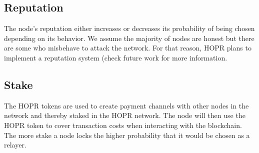 \subsection{Reputation} 
The node’s reputation either increases or decreases its probability of being chosen depending on its behavior. We assume the majority of nodes are honest but there are some who misbehave to attack the network. For that reason, HOPR plans to implement a reputation system (check future work for more information.
\subsection{Stake}
The HOPR tokens are used to create payment channels with other nodes in the network and thereby staked in the HOPR network. The node will then use the HOPR token to cover transaction costs when interacting with the blockchain. The more stake a node locks the higher probability that it would be chosen as a relayer.











    
